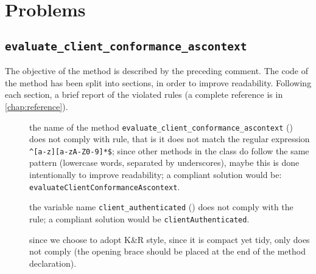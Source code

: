 \chapter{Problems}




\section{\normalfont\texttt{evaluate\_client\_conformance\_ascontext}}

The objective of the method is described by the preceding comment. The code of the method has been split into sections, in order to improve readability. Following each section, a brief report of the violated rules (a complete reference is in \cref{chap:reference}).


\begin{description}
	
	\item []
		the name of the method \verb|evaluate_client_conformance_ascontext| () does not comply with rule, that is it does not match the regular expression \verb|^[a-z][a-zA-Z0-9]*$|; since other methods in the class do follow the same pattern (lowercase words, separated by underscores), maybe this is done intentionally to improve readability; a compliant solution would be: \texttt{evaluateClientConformanceAscontext}. %
	
	\item []
		the variable name \verb|client_authenticated| () does not comply with the rule; a compliant solution would be \verb|clientAuthenticated|. 
	
	\item []
		since we choose to adopt K\&R style, since it is compact yet tidy, only  does not comply (the opening brace should be placed at the end of the method declaration).
		
\end{description}

